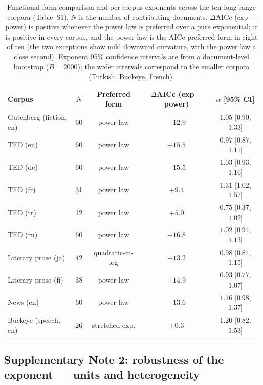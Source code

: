 \documentclass[11pt]{article}
\begin{document}
\renewcommand{\thetable}{S1}
\begin{table}[h]
\centering
\small
\begin{tabular}{lcccc}
\toprule
Corpus & $N$ & Preferred form & $\Delta$AICc (exp $-$ power) & $\alpha$ [95\% CI] \\
\midrule
Gutenberg (fiction, en) & 60 & power law & $+12.9$ & $1.05$ [$0.90$, $1.33$] \\
TED (en)                & 60 & power law & $+15.5$ & $0.97$ [$0.87$, $1.11$] \\
TED (de)                & 60 & power law & $+15.5$ & $1.03$ [$0.93$, $1.16$] \\
TED (fr)                & 31 & power law & $+9.4$  & $1.31$ [$1.02$, $1.57$] \\
TED (tr)                & 12 & power law & $+5.0$  & $0.75$ [$0.37$, $1.02$] \\
TED (ru)                & 60 & power law & $+16.8$ & $1.02$ [$0.94$, $1.13$] \\
Literary prose (ja)     & 42 & quadratic-in-log & $+13.2$ & $0.98$ [$0.84$, $1.15$] \\
Literary prose (fi)     & 38 & power law & $+14.9$ & $0.93$ [$0.77$, $1.07$] \\
News (en)               & 60 & power law & $+13.6$ & $1.16$ [$0.98$, $1.37$] \\
Buckeye (speech, en)    & 26 & stretched exp. & $+0.3$ & $1.20$ [$0.82$, $1.53$] \\
\bottomrule
\end{tabular}
\caption{Functional-form comparison and per-corpus exponents across the ten long-range corpora
(Table~S1). $N$ is the number of contributing documents. $\Delta$AICc (exp $-$ power) is positive
whenever the power law is preferred over a pure exponential; it is positive in every corpus, and the
power law is the AICc-preferred form in eight of ten (the two exceptions show mild downward curvature,
with the power law a close second). Exponent 95\% confidence intervals are from a document-level
bootstrap ($B=2000$); the wider intervals correspond to the smaller corpora (Turkish, Buckeye, French).}
\end{table}

\subsection*{Supplementary Note 2: robustness of the exponent --- units and heterogeneity}
\end{document}
